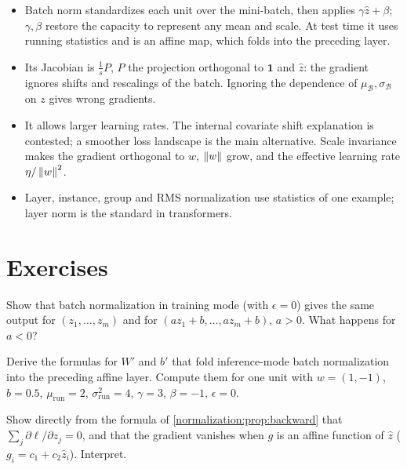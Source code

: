 \begin{notechapter}
\begin{chaptersummary}
\begin{itemize}[nosep]
  \item Batch norm standardizes each unit over the mini-batch, then applies $\gamma\hat z + \beta$; $\gamma,\beta$ restore the
        capacity to represent any mean and scale. At test time it uses running statistics and is an
        affine map, which folds into the preceding layer.
  \item Its Jacobian is $\frac1sP$, $P$ the projection orthogonal to $\mathbf 1$ and $\hat z$: the gradient ignores shifts and
        rescalings of the batch. Ignoring the dependence of $\mu_{\mathcal B},\sigma_{\mathcal B}$ on $z$ gives wrong gradients.
  \item It allows larger learning rates. The internal covariate shift explanation is contested;
        a smoother loss landscape is the main alternative. Scale invariance makes the gradient
        orthogonal to $w$, $\left\|w\right\|$ grow, and the effective learning rate $\eta/\left\|w\right\|^2$.
  \item Layer, instance, group and RMS normalization use statistics of one example; layer norm
        is the standard in transformers.
\end{itemize}
\end{chaptersummary}

\section*{Exercises}

\begin{exercise}\label{normalization:exr:1}
Show that batch normalization in training mode (with $\epsilon = 0$) gives the same output for $(z_1,\dots,z_m)$ and for
$(az_1 + b,\dots,az_m + b)$, $a>0$. What happens for $a<0$?
\end{exercise}

\begin{exercise}\label{normalization:exr:2}
Derive the formulas for $W'$ and $b'$ that fold inference-mode batch normalization into the
preceding affine layer. Compute them for one unit with $w = (1,-1)$, $b = 0.5$, $\mu_{\mathrm{run}} = 2$,
$\sigma^2_{\mathrm{run}} = 4$, $\gamma = 3$, $\beta = -1$, $\epsilon = 0$.
\end{exercise}

\begin{exercise}\label{normalization:exr:3}
Show directly from the formula of \cref{normalization:prop:backward} that $\sum_j\partial\ell/\partial z_j = 0$, and that the
gradient vanishes when $g$ is an affine function of $\hat z$ ($g_i = c_1 + c_2\hat z_i$). Interpret.
\end{exercise}


\end{notechapter}
